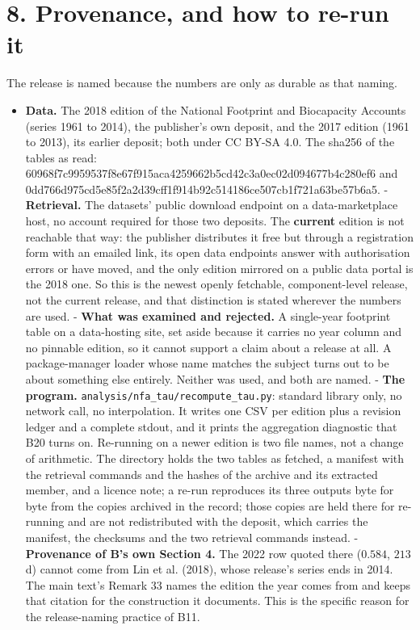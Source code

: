 \documentclass[11pt]{article}
\begin{document}
\vspace{0.8em}

\section*{8. Provenance, and how to re-run it}\label{8-provenance-and-how-to-re-run-it}

The release is named because the numbers are only as durable as that naming.

\begin{itemize}\setlength{\itemsep}{2pt}
\item \textbf{Data.} The 2018 edition of the National Footprint and Biocapacity Accounts (series 1961 to 2014), the publisher's own deposit, and the 2017 edition (1961 to 2013), its earlier deposit; both under CC BY-SA 4.0. The sha256 of the tables as read: 60968f7c9959537f\allowbreak{}8e67f915aca42596\allowbreak{}62b5cd42c3a0ec02\allowbreak{}d094677b4c280ef6 and 0dd766d975cd5e85\allowbreak{}f2a2d39cff1f914b\allowbreak{}92c514186ce507cb\allowbreak{}1f721a63be57b6a5. - \textbf{Retrieval.} The datasets' public download endpoint on a data-marketplace host, no account required for those two deposits. The \textbf{current} edition is not reachable that way: the publisher distributes it free but through a registration form with an emailed link, its open data endpoints answer with authorisation errors or have moved, and the only edition mirrored on a public data portal is the 2018 one. So this is the newest openly fetchable, component-level release, not the current release, and that distinction is stated wherever the numbers are used. - \textbf{What was examined and rejected.} A single-year footprint table on a data-hosting site, set aside because it carries no year column and no pinnable edition, so it cannot support a claim about a release at all. A package-manager loader whose name matches the subject turns out to be about something else entirely. Neither was used, and both are named. - \textbf{The program.} \texttt{analysis/\allowbreak{}nfa\_tau/\allowbreak{}recompute\_ta\allowbreak{}u.\allowbreak{}py}: standard library only, no network call, no interpolation. It writes one CSV per edition plus a revision ledger and a complete stdout, and it prints the aggregation diagnostic that B20 turns on. Re-running on a newer edition is two file names, not a change of arithmetic. The directory holds the two tables as fetched, a manifest with the retrieval commands and the hashes of the archive and its extracted member, and a licence note; a re-run reproduces its three outputs byte for byte from the copies archived in the record; those copies are held there for re-running and are not redistributed with the deposit, which carries the manifest, the checksums and the two retrieval commands instead. - \textbf{Provenance of B's own Section 4.} The 2022 row quoted there (\(0.584\), \(213\) d) cannot come from Lin et al. (2018), whose release's series ends in 2014. The main text's Remark 33 names the edition the year comes from and keeps that citation for the construction it documents. This is the specific reason for the release-naming practice of B11.
\end{itemize}
\end{document}
